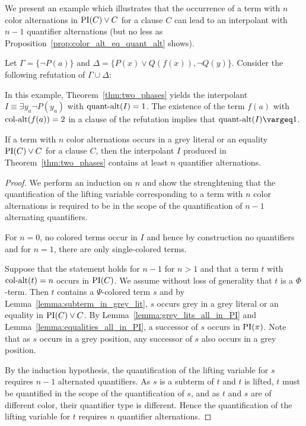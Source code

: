 \documentclass[,%
	draft=false,%
	numbers=noendperiod
	12pt,
	a4paper,
	oneside,%
	openany,
]{memoir}
\begin{document}
We present an example which illustrates that the occurrence of a term with $n$ color alternations in $\PI(C) \lor C$ for a clause $C$ can lead to an interpolant with $n-1$ quantifier alternations (but no less as Proposition~\ref{prop:color_alt_eq_quant_alt} shows).
\begin{exa}
	Let $\Gamma = \{ \lnot P(a) \}$ and $\Delta = \{ P(x) \lor Q(f(x)), \lnot Q(y) \}$.
	Consider the following refutation of $\Gamma \cup \Delta$:
	\begin{prooftree}


	\end{prooftree}

	In this example, Theorem~\ref{thm:two_phases} yields the interpolant $I \equiv \exists y_a \lnot P(y_a)$ with $\qa(I) =\nolinebreak 1$.
	The existence of the term $f(a)$ with $\ca(f(a)) = 2$ in a clause of the refutation implies that $\qa(I) \vargeq 1$.
\end{exa}
	



\begin{lemma}
	\label{lemma:col_alt_in_grey_lit_then_quant_alt}
	If a term with $n$ color alternations occurs in a grey literal or an equality $\PI(C) \lor C$ for a clause $C$, then the interpolant $I$ produced in Theorem~\ref{thm:two_phases} contains at least $n$ quantifier alternations.
\end{lemma}
\begin{proof}
	We perform an induction on $n$
	and show the strenghtening that
	the quantification of the lifting variable corresponding to a term with $n$ color alternations is required to be in the scope of the quantification of $n-1$ alternating quantifiers.

	For $n=0$, no colored terms occur in $I$ and hence by construction no quantifiers
	and for $n=1$, there are only single-colored terms.

	Suppose that the statement holds for $n-1$ for $n>1$ and that a term $t$ with $\ca(t) = n$ occurs in $\PI(C)$.
	We assume without loss of generality that $t$ is a $\Phi$-term.
	Then $t$ contains a $\Psi$-colored term $s$ and
	by Lemma~\ref{lemma:subterm_in_grey_lit}, $s$ occurs grey in a grey literal or an equality in $\PI(C) \lor C$.
	By Lemma~\ref{lemma:grey_lits_all_in_PI} and Lemma~\ref{lemma:equalities_all_in_PI}, a successor of $s$ occurs in $\PI(\pi)$. Note that as $s$ occurs in a grey position, any successor of $s$ also occurs in a grey position.

	By the induction hypothesis, the quantification of the lifting variable for $s$ requires $n-1$ alternated quantifiers.
	As $s$ is a subterm of $t$ and $t$ is lifted, $t$ must be quantified in the scope of the quantification of $s$, and as $t$ and $s$ are of different color, their quantifier type is different. 
	Hence the quantification of the lifting variable for $t$ requires $n$ quantifier alternations.
\end{proof}
\end{document}

